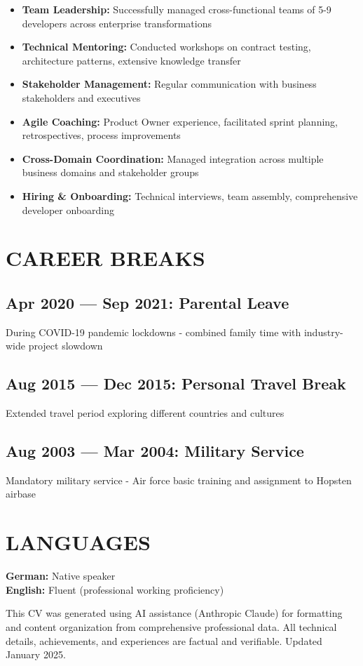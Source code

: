 \documentclass[10pt,a4paper]{article}
\newenvironment{compactlist}{\begin{itemize}[leftmargin=1em,itemsep=0pt,parsep=0pt,topsep=0pt,partopsep=0pt]}{\end{itemize}}
\begin{document}
\begin{compactlist}
\item \textbf{Team Leadership:} Successfully managed cross-functional teams of 5-9 developers across enterprise transformations
\item \textbf{Technical Mentoring:} Conducted workshops on contract testing, architecture patterns, extensive knowledge transfer
\item \textbf{Stakeholder Management:} Regular communication with business stakeholders and executives
\item \textbf{Agile Coaching:} Product Owner experience, facilitated sprint planning, retrospectives, process improvements
\item \textbf{Cross-Domain Coordination:} Managed integration across multiple business domains and stakeholder groups
\item \textbf{Hiring \& Onboarding:} Technical interviews, team assembly, comprehensive developer onboarding
\end{compactlist}

\section{CAREER BREAKS}

\subsection{Apr 2020 — Sep 2021: Parental Leave}
During COVID-19 pandemic lockdowns - combined family time with industry-wide project slowdown

\subsection{Aug 2015 — Dec 2015: Personal Travel Break}
Extended travel period exploring different countries and cultures

\subsection{Aug 2003 — Mar 2004: Military Service}
Mandatory military service - Air force basic training and assignment to Hopsten airbase

\section{LANGUAGES}

\textbf{German:} Native speaker\\
\textbf{English:} Fluent (professional working proficiency)

\vfill

\begin{center}
\footnotesize
\textcolor{secondarycolor}{This CV was generated using AI assistance (Anthropic Claude) for formatting and content organization from comprehensive professional data. All technical details, achievements, and experiences are factual and verifiable. Updated January 2025.}
\end{center}
\end{document}
